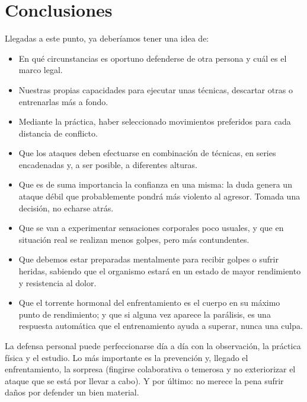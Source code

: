 \chapter{Conclusiones}

Llegadas a este punto, ya deberíamos tener una idea de:

\begin{itemize}
  \item En qué circunstancias es oportuno defenderse de otra persona y cuál es el marco legal.
  \item Nuestras propias capacidades para ejecutar unas técnicas, descartar otras o entrenarlas más a fondo.
  \item Mediante la práctica, haber seleccionado movimientos preferidos para cada distancia de conflicto.
  \item Que los ataques deben efectuarse en combinación de técnicas, en series encadenadas y, a ser posible, a diferentes alturas.
  \item Que es de suma importancia la confianza en una misma: la duda genera un ataque débil que probablemente pondrá más violento al agresor. Tomada una decisión, no echarse atrás.
  \item Que se van a experimentar sensaciones corporales poco usuales, y que en situación real se realizan menos golpes, pero más contundentes.
  \item Que debemos estar preparadas mentalmente para recibir golpes o sufrir heridas, sabiendo que el organismo estará en un estado de mayor rendimiento y resistencia al dolor.
  \item Que el torrente hormonal del enfrentamiento es el cuerpo en su máximo punto de rendimiento; y que si alguna vez aparece la parálisis, es una respuesta automática que el entrenamiento ayuda a superar, nunca una culpa.
\end{itemize}

La defensa personal puede perfeccionarse día a día con la observación, la práctica física y el estudio. Lo más importante es la prevención y, llegado el enfrentamiento, la sorpresa (fingirse colaborativa o temerosa y no exteriorizar el ataque que se está por llevar a cabo). Y por último: no merece la pena sufrir daños por defender un bien material.

